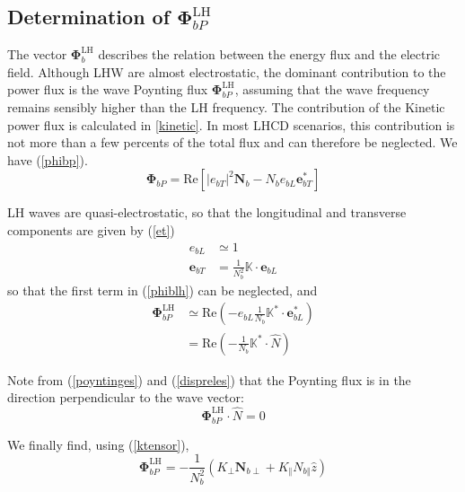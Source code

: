 \subsection{Determination of $\mathbf{\Phi}_{bP}^{\text{LH}}$}

The vector $\mathbf{\Phi}_{b}^{\text{LH}}$ describes the relation between the
energy flux and the electric field. Although LHW are almost electrostatic, the
dominant contribution to the power flux is the wave Poynting flux
$\mathbf{\Phi}_{bP}^{\text{LH}}$, assuming that the wave frequency remains
sensibly higher than the LH frequency. The contribution of the Kinetic power
flux is calculated in \ref{kinetic}. In most LHCD scenarios, this contribution
is not more than a few percents of the total flux and can therefore be
neglected. We have (\ref{phibp}).%
\begin{equation}
\mathbf{\Phi}_{bP}=\text{Re}\left[  \left|  e_{bT}\right|  ^{2}\mathbf{N}%
_{b}-N_{b}e_{bL}\mathbf{e}_{bT}^{\ast}\right]  \label{phiblh}%
\end{equation}

LH waves are quasi-electrostatic, so that the longitudinal and transverse
components are given by (\ref{et})
\begin{align}
e_{bL}  &  \simeq1\\
\mathbf{e}_{bT}  &  =\frac{1}{N_{b}^{2}}\mathbb{K}\cdot\mathbf{e}_{bL}%
\end{align}
so that the first term in (\ref{phiblh}) can be neglected, and
\begin{align}
\mathbf{\Phi}_{bP}^{\text{LH}}  &  \simeq\text{Re}\left(  -e_{bL}\frac
{1}{N_{b}}\mathbb{K}^{\ast}\cdot\mathbf{e}_{bL}^{\ast}\right) \nonumber\\
&  =\text{Re}\left(  -\frac{1}{N_{b}}\mathbb{K}^{\ast}\cdot\widehat{N}\right)
\label{poyntinges}%
\end{align}

Note from (\ref{poyntinges}) and (\ref{dispreles}) that the Poynting flux is
in the direction perpendicular to the wave vector:
\begin{equation}
\mathbf{\Phi}_{bP}^{\text{LH}}\cdot\widehat{N}=0
\end{equation}

We finally find, using (\ref{ktensor}),
\begin{equation}
\mathbf{\Phi}_{bP}^{\text{LH}}=-\frac{1}{N_{b}^{2}}\left(  K_{\perp}%
\mathbf{N}_{b\perp}+K_{\Vert}N_{b\Vert}\widehat{z}\right)  \label{phiblh2}%
\end{equation}

